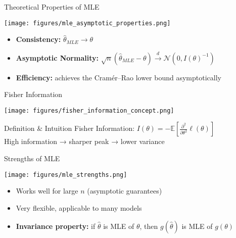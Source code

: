 \begin{frame}{Theoretical Properties of MLE}
  \footnotesize
  \begin{center}
    \texttt{[image: figures/mle\_asymptotic\_properties.png]}
  \end{center}
  \vspace{-0.8em}
  \begin{itemize}
    \footnotesize
    \item \textbf{Consistency:} \(\hat{\theta}_{MLE} \to \theta\)
    \item \textbf{Asymptotic Normality:} \(\sqrt{n}(\hat{\theta}_{MLE} - \theta) \xrightarrow{d} \mathcal{N}(0, I(\theta)^{-1})\)
    \item \textbf{Efficiency:} achieves the Cramér–Rao lower bound asymptotically
  \end{itemize}
\end{frame}

\begin{frame}{Fisher Information}
  \footnotesize
  \begin{center}
    \texttt{[image: figures/fisher\_information\_concept.png]}
  \end{center}
  \vspace{-0.7em}
  \begin{block}{Definition \& Intuition}
    \footnotesize
    Fisher Information: \(I(\theta) = -\mathbb{E}\left[ \frac{\partial^2}{\partial \theta^2}\ell(\theta) \right]\)\\
    High information → sharper peak → lower variance
  \end{block}
\end{frame}

\begin{frame}{Strengths of MLE}
  \footnotesize
  \begin{center}
    \texttt{[image: figures/mle\_strengths.png]}
  \end{center}
  \vspace{-0.7em}
  \begin{itemize}
    \footnotesize
    \item Works well for large \(n\) (asymptotic guarantees)
    \item Very flexible, applicable to many models
    \item \textbf{Invariance property:} if \(\hat{\theta}\) is MLE of \(\theta\), then \(g(\hat{\theta})\) is MLE of \(g(\theta)\)
  \end{itemize}
\end{frame}

